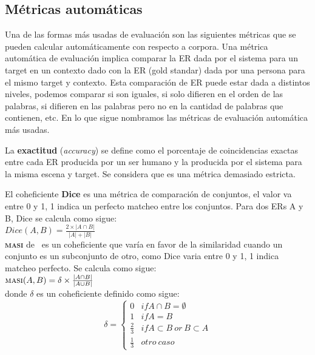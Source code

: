 \subsection{M\'etricas autom\'aticas}
\label{sec:metricasAutomaticas}

Una de las formas m\'as usadas de evaluaci\'on son las siguientes m\'etricas que se pueden calcular autom\'aticamente con respecto a corpora.
Una m\'etrica autom\'atica de evaluaci\'on implica comparar la ER dada por el sistema para un target en un contexto dado con la ER (gold standar) dada por una persona para el mismo target y contexto.
Esta comparaci\'on de ER puede estar dada a distintos niveles, podemos comparar si son iguales, si solo difieren en el orden de las palabras, si difieren en las palabras pero no en la cantidad de palabras que contienen, etc. En lo que sigue nombramos las m\'etricas de evaluaci\'on autom\'atica m\'as usadas.

La \textbf{exactitud} ({\it accuracy}) se define como el porcentaje de coincidencias exactas entre cada ER producida por un ser humano y la producida por el sistema para la misma escena y target. Se considera que es una m\'etrica demasiado estricta.

El coheficiente \textbf{Dice} es una m\'etrica de comparaci\'on de conjuntos, el valor va entre 0 y 1, 1 indica un perfecto matcheo entre los conjuntos. Para dos ERs A y B, Dice se calcula como sigue:\\

$Dice(A,B) = \frac{2\times|A \cap B|}{|A|+|B|}$\\

\textbf{\textsc{masi}} de \cite{masi}~es un coheficiente que var\'ia en favor de la similaridad cuando un conjunto es un subconjunto de otro, como Dice varia entre 0 y 1, 1 indica matcheo perfecto. Se calcula como sigue:\\

$\textsc{masi}(A,B) = \delta \times \frac{|A \cap B|}{|A \cup B|}$ \\


donde $\delta$ es un coheficiente definido como sigue:\\


 \begin{equation}
     \delta  = \left\{
	       \begin{array}{ll}
		 0      & if A \cap B = \emptyset \\
		 1 & if A = B  \\
		 \frac{2}{3}     & if A \subset B ~or~ B \subset A\\
		 \frac{1}{3}     & otro ~caso
	       \end{array}
	     \right.
 \end{equation}

